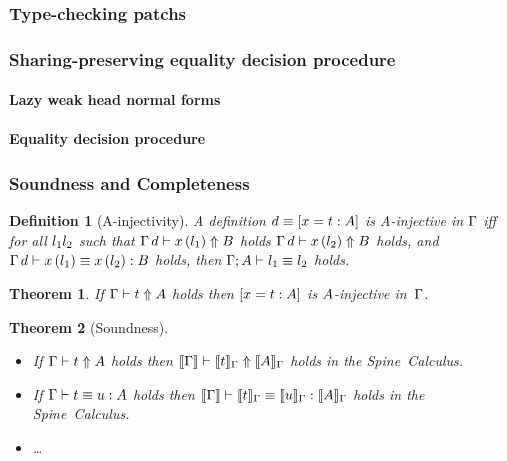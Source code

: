 \documentclass[9pt,authoryear]{sigplanconf}
\newtheorem{theorem}{Theorem}
\newtheorem{definition}{Definition}
\begin{document}
\subsubsection{Type-checking patchs}


\subsubsection{Sharing-preserving equality decision procedure}

\paragraph{Lazy weak head normal forms}


\paragraph{Equality decision procedure}


\subsubsection{Soundness and Completeness}

\begin{definition}[A-injectivity]
A definition $d \equiv [x = t : A]$ is A-injective
in $\Gamma$ iff for all $l_1 l_2$ such that
$\Gamma \, d \vdash x\,(l_1) \Uparrow B$ holds
$\Gamma \, d \vdash x\,(l_2) \Uparrow B$
holds, and
$\Gamma \, d \vdash x\,(l_1) \equiv x\,(l_2) : B$
holds, then $\Gamma; A \vdash l_1 \equiv l_2$ holds. 
\end{definition}

\begin{theorem}
If $\Gamma \vdash t \Uparrow A$ holds then $[x = t : A]$ is
$A$-injective in~$\Gamma$.
\end{theorem}

\begin{theorem}[Soundness]\ \\[-1em]
\begin{itemize}
\item  If $\Gamma \vdash t \Uparrow A$ holds then 
$\llbracket \Gamma \rrbracket \vdash \llbracket t \rrbracket_{\Gamma} \Uparrow \llbracket A \rrbracket_{\Gamma}$
holds in the Spine~Calculus. 
\item If $\Gamma \vdash t \equiv u : A$ holds then
$\llbracket \Gamma \rrbracket \vdash \llbracket t \rrbracket_{\Gamma} \equiv \llbracket u \rrbracket_{\Gamma} : \llbracket A \rrbracket_{\Gamma}$
holds in the Spine~Calculus. 
\item \ldots
\end{itemize}
\end{theorem}
\end{document}
